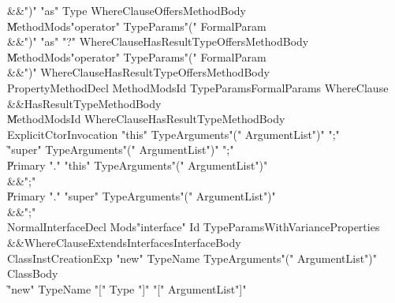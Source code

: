 \begin{grammar}
          &&\xcd")"  \xcd"as"  Type  WhereClause\opt  Offers\opt  MethodBody\\
    \|   MethodMods\opt  \xcd"operator"  TypeParams\opt  \xcd"("  FormalParam  \\
          &&\xcd")"  \xcd"as"  \xcd"?"  WhereClause\opt  HasResultType\opt  Offers\opt  MethodBody\\
    \|   MethodMods\opt  \xcd"operator"  TypeParams\opt  \xcd"("  FormalParam  \\
          &&\xcd")"  WhereClause\opt  HasResultType\opt  Offers\opt  MethodBody\\
 PropertyMethodDecl  \:   MethodMods\opt  Id  TypeParams\opt  FormalParams  WhereClause\opt\\
          &&HasResultType\opt  MethodBody\\
    \|   MethodMods\opt  Id  WhereClause\opt  HasResultType\opt  MethodBody\\
 ExplicitCtorInvocation  \:   \xcd"this"  TypeArguments\opt  \xcd"("  ArgumentList\opt  \xcd")"  \xcd";"\\
    \|   \xcd"super"  TypeArguments\opt  \xcd"("  ArgumentList\opt  \xcd")"  \xcd";"\\
    \|   Primary  \xcd"."  \xcd"this"  TypeArguments\opt  \xcd"("  ArgumentList\opt  \xcd")"\\
          &&\xcd";"\\
    \|   Primary  \xcd"."  \xcd"super"  TypeArguments\opt  \xcd"("  ArgumentList\opt  \xcd")"\\
          &&\xcd";"\\
 NormalInterfaceDecl  \:   Mods\opt  \xcd"interface"  Id  TypeParamsWithVariance\opt  Properties\opt\\
          &&WhereClause\opt  ExtendsInterfaces\opt  InterfaceBody\\
 ClassInstCreationExp  \:   \xcd"new"  TypeName  TypeArguments\opt  \xcd"("  ArgumentList\opt  \xcd")"  ClassBody\opt\\
    \|   \xcd"new"  TypeName  \xcd"["  Type  \xcd"]"  \xcd"["  ArgumentList\opt  \xcd"]"\\
\end{grammar}


